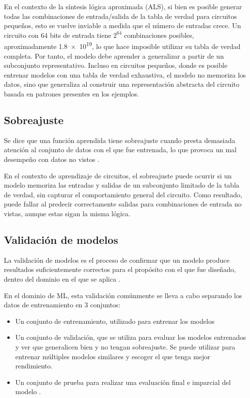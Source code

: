 En el contexto de la síntesis lógica aproximada (ALS), si bien es posible
generar todas las combinaciones de entrada/salida de la tabla de verdad para
circuitos pequeños, esto se vuelve inviable a medida que el número de entradas
crece. Un circuito con 64 bits de entrada tiene $2^{64}$ combinaciones
posibles, aproximadamente \num{1.8e19}, lo que hace imposible utilizar su tabla
de verdad completa. Por tanto, el modelo debe aprender a generalizar a partir
de un subconjunto representativo. Incluso en circuitos pequeños, donde es
posible entrenar modelos con una tabla de verdad exhaustiva, el modelo no
memoriza los datos, sino que generaliza al construir una representación
abstracta del circuito basada en patrones presentes en los ejemplos.

\subsection{Sobreajuste}

Se dice que una función aprendida tiene sobreajuste cuando presta demasiada
atención al conjunto de datos con el que fue entrenada, lo que provoca un mal
desempeño con datos no vistos \cite{russell2016artificial}.

En el contexto de aprendizaje de circuitos, el sobreajuste puede ocurrir si un
modelo memoriza las entradas y salidas de un subconjunto limitado de la tabla
de verdad, sin capturar el comportamiento general del circuito. Como resultado,
puede fallar al predecir correctamente salidas para combinaciones de entrada no
vistas, aunque estas sigan la misma lógica.

\subsection{Validación de modelos}

La validación de modelos es el proceso de confirmar que un modelo produce
resultados suficientemente correctos para el propósito con el que fue diseñado,
dentro del dominio en el que se aplica \cite{schlesinger_terminology_1979}.

En el dominio de ML, esta validación comúnmente se lleva a cabo separando los
datos de entrenamiento en 3 conjuntos:

\begin{itemize}
  \item Un conjunto de entrenamiento, utilizado para entrenar los modelos
  \item Un conjunto de validación, que se utiliza para evaluar los modelos
    entrenados y ver que generalicen bien y no tengan sobreajuste. Se puede
    utilizar para entrenar múltiples modelos similares y escoger el que tenga
    mejor rendimiento.
  \item Un conjunto de prueba para realizar una evaluación final e imparcial
    del modelo \cite{russell2016artificial}.
\end{itemize}

